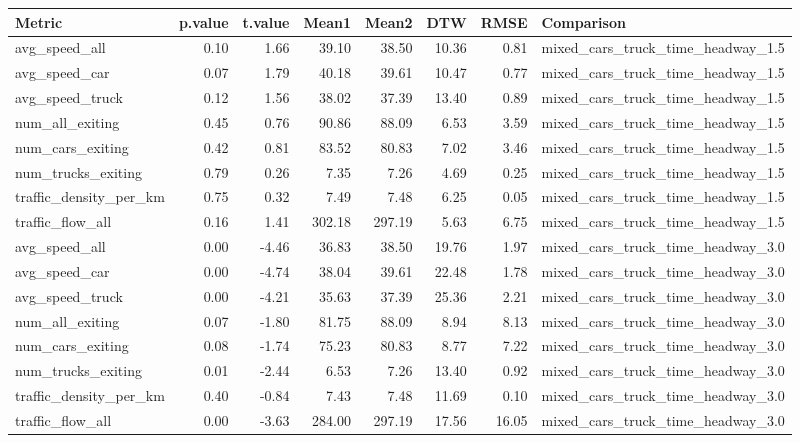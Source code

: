 \begin{table}[ht]
\centering
\begin{tabular}{lrrrrrrl}
  \hline
Metric & p.value & t.value & Mean1 & Mean2 & DTW & RMSE & Comparison \\ 
  \hline
avg\_speed\_all & 0.10 & 1.66 & 39.10 & 38.50 & 10.36 & 0.81 & mixed\_cars\_truck\_time\_headway\_1.5 \\ 
  avg\_speed\_car & 0.07 & 1.79 & 40.18 & 39.61 & 10.47 & 0.77 & mixed\_cars\_truck\_time\_headway\_1.5 \\ 
  avg\_speed\_truck & 0.12 & 1.56 & 38.02 & 37.39 & 13.40 & 0.89 & mixed\_cars\_truck\_time\_headway\_1.5 \\ 
  num\_all\_exiting & 0.45 & 0.76 & 90.86 & 88.09 & 6.53 & 3.59 & mixed\_cars\_truck\_time\_headway\_1.5 \\ 
  num\_cars\_exiting & 0.42 & 0.81 & 83.52 & 80.83 & 7.02 & 3.46 & mixed\_cars\_truck\_time\_headway\_1.5 \\ 
  num\_trucks\_exiting & 0.79 & 0.26 & 7.35 & 7.26 & 4.69 & 0.25 & mixed\_cars\_truck\_time\_headway\_1.5 \\ 
  traffic\_density\_per\_km & 0.75 & 0.32 & 7.49 & 7.48 & 6.25 & 0.05 & mixed\_cars\_truck\_time\_headway\_1.5 \\ 
  traffic\_flow\_all & 0.16 & 1.41 & 302.18 & 297.19 & 5.63 & 6.75 & mixed\_cars\_truck\_time\_headway\_1.5 \\ 
  avg\_speed\_all & 0.00 & -4.46 & 36.83 & 38.50 & 19.76 & 1.97 & mixed\_cars\_truck\_time\_headway\_3.0 \\ 
  avg\_speed\_car & 0.00 & -4.74 & 38.04 & 39.61 & 22.48 & 1.78 & mixed\_cars\_truck\_time\_headway\_3.0 \\ 
  avg\_speed\_truck & 0.00 & -4.21 & 35.63 & 37.39 & 25.36 & 2.21 & mixed\_cars\_truck\_time\_headway\_3.0 \\ 
  num\_all\_exiting & 0.07 & -1.80 & 81.75 & 88.09 & 8.94 & 8.13 & mixed\_cars\_truck\_time\_headway\_3.0 \\ 
  num\_cars\_exiting & 0.08 & -1.74 & 75.23 & 80.83 & 8.77 & 7.22 & mixed\_cars\_truck\_time\_headway\_3.0 \\ 
  num\_trucks\_exiting & 0.01 & -2.44 & 6.53 & 7.26 & 13.40 & 0.92 & mixed\_cars\_truck\_time\_headway\_3.0 \\ 
  traffic\_density\_per\_km & 0.40 & -0.84 & 7.43 & 7.48 & 11.69 & 0.10 & mixed\_cars\_truck\_time\_headway\_3.0 \\ 
  traffic\_flow\_all & 0.00 & -3.63 & 284.00 & 297.19 & 17.56 & 16.05 & mixed\_cars\_truck\_time\_headway\_3.0 \\ 
   \hline
\end{tabular}
\end{table}
